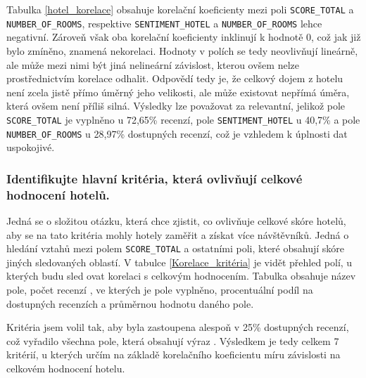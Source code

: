 \documentclass[czech,BP]{thesiskiv}
\begin{document}
Tabulka \ref{hotel_korelace} obsahuje korelační koeficienty mezi poli \texttt{SCO\-RE\_TOTAL} a \texttt{NUM\-BER\_OF\_ROOMS}, respektive \texttt{SENTIMENT\_\-HOTEL} a \texttt{NUMBER\_OF\_ROOMS} lehce negativní. Zároveň však oba korelační koeficienty inklinují k hodnotě 0, což jak již bylo zmíněno, znamená nekorelaci. Hodnoty v polích se tedy neovlivňují lineárně, ale může mezi nimi být jiná nelineární závislost, kterou ovšem nelze prostřednictvím korelace odhalit. Odpovědí tedy je, že  celkový dojem z hotelu není zcela jistě přímo úměrný jeho velikosti, ale může existovat nepřímá úměra, která ovšem není příliš silná. Výsledky lze považovat za relevantní, jelikož pole \texttt{SCORE\_TOTAL} je vyplněno u 72,65\% recenzí, pole \texttt{SENTIMENT\_HOTEL} u 40,7\% a pole \texttt{NUMBER\_OF\_ROOMS} u 28,97\% dostupných recenzí, což je vzhledem k úplnosti dat uspokojivé.

\subsubsection{Identifikujte hlavní kritéria, která ovlivňují celkové hodnocení hotelů.}
\label{subsub:kriteria}
Jedná se o složitou otázku, která chce zjistit, co ovlivňuje celkové skóre hotelů, aby se na tato kritéria mohly hotely zaměřit a získat více návštěvníků. Jedná o hledání vztahů mezi polem \texttt{SCORE\_TOTAL} a ostatními poli, které obsahují skóre jiných sledovaných oblastí. V tabulce \ref{Korelace_kritéria} je vidět přehled polí, u kterých budu sled  ovat korelaci s celkovým hodnocením. Tabulka obsahuje název pole, počet recenzí , ve kterých je pole vyplněno, procentuální podíl na dostupných recenzích a průměrnou hodnotu daného pole. 


Kritéria jsem volil tak, aby byla zastoupena alespoň v 25\% dostupných recenzí, což vyřadilo všechna pole, která obsahují výraz . Výsledkem je tedy celkem 7 kritérií, u kterých určím na základě korelačního koeficientu míru závislosti na celkovém hodnocení hotelu.
\end{document}
